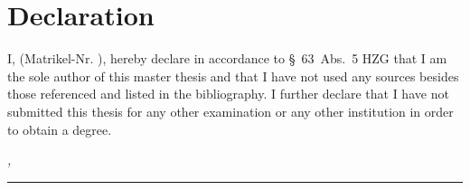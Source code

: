 %
\chapter*{Declaration}
\label{sec:declaration}
\thispagestyle{empty}

I, \thesisName (Matrikel-Nr. \thesisMatNr), hereby declare in accordance to §~63~Abs.~5 HZG that I am the sole author of this master thesis and that I have not used any sources besides those referenced and listed in the bibliography.
I further declare that I have not submitted this thesis for any other examination or any other institution in order to obtain a degree.

\bigskip

\noindent\textit{\thesisUniversityCity, \thesisDate}

\smallskip

\begin{flushright}
	\begin{minipage}{5cm}
		\rule{\textwidth}{1pt}
		\centering\thesisName
	\end{minipage}
\end{flushright}

